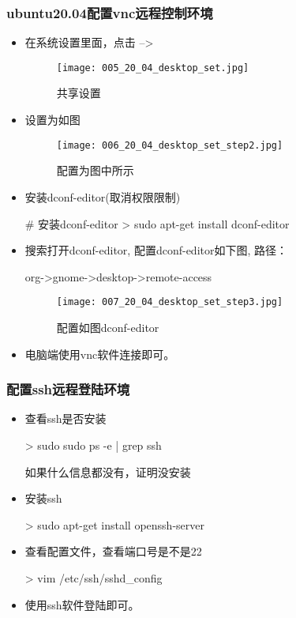 \subsubsection{ubuntu20.04配置vnc远程控制环境}
\begin{itemize}

\item 在系统设置里面，点击 --> 
\begin{figure}[H]
\centering
\texttt{[image: 005\_20\_04\_desktop\_set.jpg]}
\caption{共享设置}
\end{figure}

\item 设置为如图
\begin{figure}[H]
\centering
\texttt{[image: 006\_20\_04\_desktop\_set\_step2.jpg]}
\caption{配置为图中所示}
\end{figure}

\item 安装dconf-editor(取消权限限制)
\begin{commandbox}
# 安装dconf-editor
 > sudo apt-get install dconf-editor
\end{commandbox}

\item 搜索打开dconf-editor, 配置dconf-editor如下图, 路径：
\begin{messagebox}
org->gnome->desktop->remote-access
\end{messagebox}
\begin{figure}[H]
\centering
\texttt{[image: 007\_20\_04\_desktop\_set\_step3.jpg]}
\caption{配置如图dconf-editor}
\end{figure}

\item 电脑端使用vnc软件连接即可。

\end{itemize}

\subsubsection{配置ssh远程登陆环境}
\begin{itemize}
\item 查看ssh是否安装
\begin{commandbox}
 > sudo sudo ps -e | grep ssh
\end{commandbox}
如果什么信息都没有，证明没安装

\item 安装ssh
\begin{commandbox}
 > sudo apt-get install openssh-server
\end{commandbox}

\item 查看配置文件，查看端口号是不是22
\begin{commandbox}
 > vim /etc/ssh/sshd_config
\end{commandbox}

\item 使用ssh软件登陆即可。

\end{itemize}

